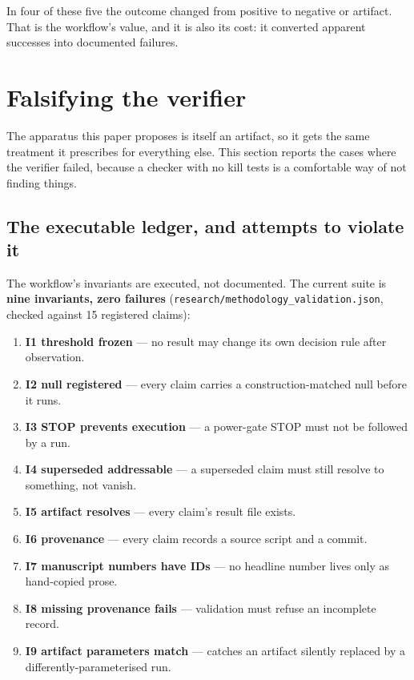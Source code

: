 \documentclass[11pt]{article}
\begin{document}
In four of these five the outcome changed from positive to negative or
artifact. That is the workflow's value, and it is also its cost: it
converted apparent successes into documented failures.

\section{Falsifying the verifier}
\label{sec:falsify}

The apparatus this paper proposes is itself an artifact, so it gets the same
treatment it prescribes for everything else. This section reports the cases
where the verifier failed, because a checker with no kill tests is a
comfortable way of not finding things.

\subsection{The executable ledger, and attempts to violate it}

The workflow's invariants are executed, not documented. The current suite is
\textbf{nine invariants, zero failures}
(\texttt{research/methodology\_validation.json}, checked against 15 registered
claims):

\begin{enumerate}
\item \textbf{I1 threshold frozen} --- no result may change its own decision
  rule after observation.
\item \textbf{I2 null registered} --- every claim carries a
  construction-matched null before it runs.
\item \textbf{I3 STOP prevents execution} --- a power-gate STOP must not be
  followed by a run.
\item \textbf{I4 superseded addressable} --- a superseded claim must still
  resolve to something, not vanish.
\item \textbf{I5 artifact resolves} --- every claim's result file exists.
\item \textbf{I6 provenance} --- every claim records a source script and a
  commit.
\item \textbf{I7 manuscript numbers have IDs} --- no headline number lives
  only as hand-copied prose.
\item \textbf{I8 missing provenance fails} --- validation must refuse an
  incomplete record.
\item \textbf{I9 artifact parameters match} --- catches an artifact silently
  replaced by a differently-parameterised run.
\end{enumerate}
\end{document}
